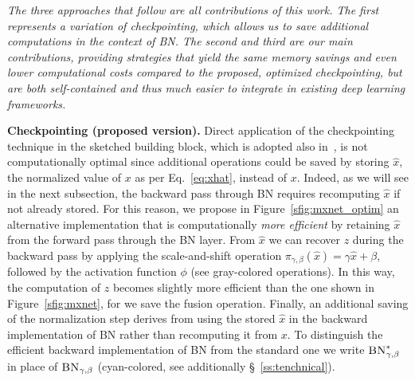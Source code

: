 \documentclass[10pt,twocolumn,letterpaper]{article}
\newcommand{\myparagraph}[1]{\vspace{5pt}\noindent\textbf{#1}}
\begin{document}
\vspace{5pt}
\emph{The three approaches that follow are all contributions of this work. The first represents a variation of checkpointing, which allows us to save additional computations in the context of \textsc{BN}. The second and third are our main contributions, providing strategies that yield the same memory savings and even lower computational costs compared to the proposed, optimized checkpointing, but are both self-contained and thus much easier to integrate in existing deep learning frameworks.}


\myparagraph{Checkpointing (proposed version).}
Direct application of the checkpointing technique in the sketched building block, which is adopted also in~\cite{Pleiss+17}, is not computationally optimal since additional operations could be saved by storing $\hat x$, \ie the normalized value of $x$ as per Eq.~\eqref{eq:xhat}, instead of $x$. Indeed, as we will see in the next subsection, the backward pass through \textsc{BN} requires recomputing $\hat x$ if not already stored. For this reason, we propose in Figure~\ref{sfig:mxnet_optim} an alternative implementation that is computationally \emph{more efficient} by retaining $\hat x$ from the forward pass through the \textsc{BN} layer. From $\hat x$ we can recover $z$ during the backward pass by applying the scale-and-shift operation $\pi_{\gamma,\beta}(\hat x)=\gamma\hat x+\beta$, followed by the activation function $\phi$ (see gray-colored operations). In this way, the computation of $z$ becomes slightly more efficient than the one shown in Figure~\ref{sfig:mxnet}, for we save the fusion operation. Finally, an additional saving of the normalization step derives from using the stored $\hat x$ in the backward implementation of \textsc{BN} rather than recomputing it from $x$. To distinguish the efficient backward implementation of \textsc{BN} from the standard one we write $\textsc{BN}_{\gamma,\beta}^*$ in place of $\textsc{BN}_{\gamma,\beta}$ (cyan-colored, see additionally \S~\ref{ss:tenchnical}).
\end{document}
